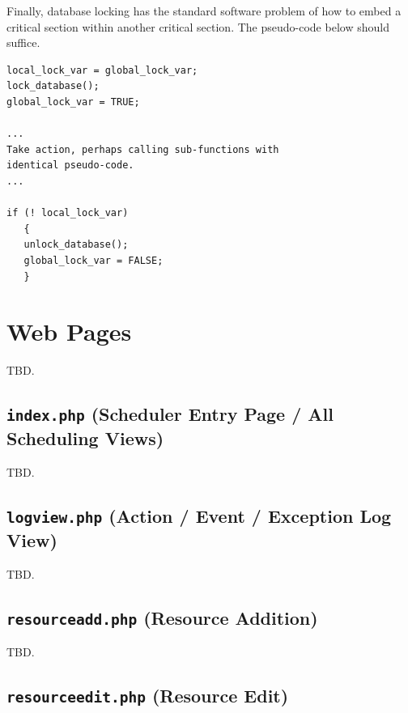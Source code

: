 \documentclass[letterpaper,10pt,titlepage]{article}
\begin{document}
Finally, database locking has the standard software problem of how to embed a critical
section within another critical section.  The pseudo-code below should suffice.

\begin{verbatim}
local_lock_var = global_lock_var;
lock_database();
global_lock_var = TRUE;

...
Take action, perhaps calling sub-functions with
identical pseudo-code.
...

if (! local_lock_var)
   {
   unlock_database();
   global_lock_var = FALSE;
   }
\end{verbatim}


\section{Web Pages}
\label{swpg0}

TBD.


\subsection{\texttt{index.php} (Scheduler Entry Page / All Scheduling Views)}
\label{swpg0:siph0}

TBD.


\subsection{\texttt{logview.php} (Action / Event / Exception Log View)}
\label{swpg0:slvw0}

TBD.


\subsection{\texttt{resourceadd.php} (Resource Addition)}
\label{swpg0:srad0}

TBD.


\subsection{\texttt{resourceedit.php} (Resource Edit)}
\label{swpg0:sred0}
\end{document}
